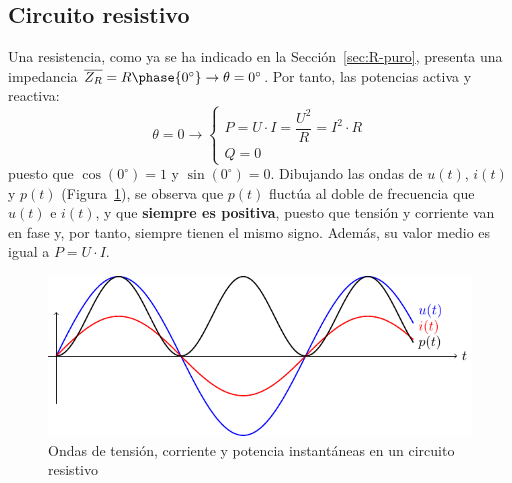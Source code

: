 \subsection{Circuito resistivo}\label{sec:potencia_R}
Una resistencia, como ya se ha indicado en la
Sección~\ref{sec:R-puro}, presenta una impedancia
$\overline{Z_R}=R\phase{0^\circ}\rightarrow \theta=0^\circ$. Por
tanto, las potencias activa y reactiva:
\begin{equation}
  \theta = 0 \rightarrow
  \boxed{\begin{cases}
    P = U\cdot I = \dfrac{U^2}{R} = I^2\cdot R\\
    Q = 0
  \end{cases}}
\end{equation}
puesto que $\cos(0^\circ)=1$ y $\sin(0^\circ)=0$. Dibujando las ondas
de $u(t)$, $i(t)$ y $p(t)$ (Figura~\ref{fig:resistivoPotencia}), se
observa que $p(t)$ fluctúa al doble de frecuencia que $u(t)$ e $i(t)$,
y que \textbf{siempre es positiva}, puesto que tensión y corriente van
en fase y, por tanto, siempre tienen el mismo signo. Además, su valor
medio es igual a $P=U\cdot I$.
\begin{figure}[H]
  \centering \includegraphics{../figs/resistivoPotencia.pdf}
  \caption{Ondas de tensión, corriente y potencia instantáneas en un
    circuito resistivo}
  \label{fig:resistivoPotencia}
\end{figure}
	
